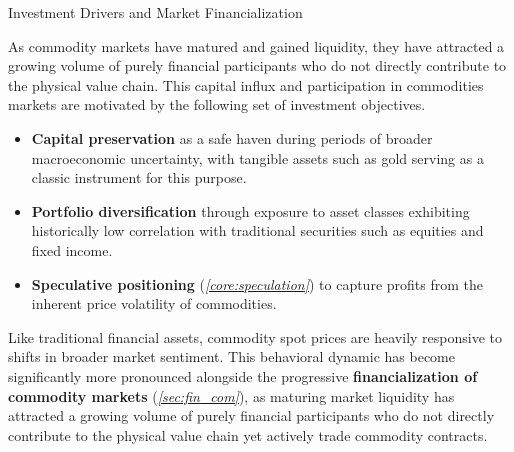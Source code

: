 \documentclass[10pt]{article}
\begin{document}
    \begin{core}{Investment Drivers and Market Financialization}

      As commodity markets have matured and gained liquidity, they have attracted a growing volume of purely financial participants who do not directly contribute to the physical value chain. This capital influx and participation in commodities markets are motivated by the following set of investment objectives.

      \begin{itemize}

        \item \textbf{Capital preservation} as a safe haven during periods of broader macroeconomic uncertainty, with tangible assets such as gold serving as a classic instrument for this purpose.

        \item \textbf{Portfolio diversification} through exposure to asset classes exhibiting historically low correlation with traditional securities such as equities and fixed income.

        \item \textbf{Speculative positioning} (\textit{\autoref{core:speculation}}) to capture profits from the inherent price volatility of commodities.

      \end{itemize}

      Like traditional financial assets, commodity spot prices are heavily responsive to shifts in broader market sentiment. This behavioral dynamic has become significantly more pronounced alongside the progressive \textbf{financialization of commodity markets} (\textit{\autoref{sec:fin_com}}), as maturing market liquidity has attracted a growing volume of purely financial participants who do not directly contribute to the physical value chain yet actively trade commodity contracts.

    \end{core}
\end{document}
